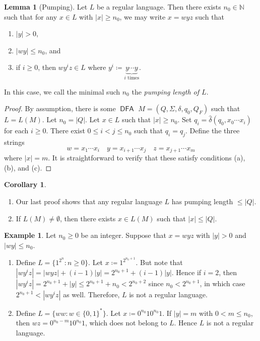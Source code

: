 \documentclass[10pt,letterpaper,cm]{nupset}
\theoremstyle{definition}
\newtheorem{exmp}[definition]{Example}
\theoremstyle{theorem}
\newtheorem{lemma}[definition]{Lemma}
\newtheorem{corollary}[definition]{Corollary}
\theoremstyle{remark}
\newcommand{\N}{\mathbb N}
\newcommand{\1}{\mathbf{1}}
\newcommand{\0}{\vec 0}
\DeclareMathOperator{\DFA}{\mathsf{DFA}}
\begin{document}
\begin{lemma}[Pumping] Let $L$ be a regular language. Then there exists $n_0 \in \N$ such that for any $x\in L$ with $|x|\geq n_0$, we may write $x=wyz$ such that
\begin{enumerate}[label=(\alph*)]
\item $|y| >0$,
\item $|wy|\leq n_0$, and
\item if $i\geq 0$, then $wy^iz \in L$ where $y^i \coloneqq \underbrace{y\cdots y}_{i \text{ times}}$.
\end{enumerate}
In this case, we call the minimal such $n_0$ the \textit{pumping length of $L$}.
\end{lemma}
\begin{proof}
By assumption, there is some $\DFA$ $M = (Q, \Sigma, \delta, q_0, Q_F)$ such that $L = L(M)$. Let $n_0 = |Q|$. Let $x\in L$ such that $|x|\geq n_0$. Set $q_i = \hat{\delta}(q_0, x_0 \cdots x_i)$ for each $i\geq 0$.  There exist $0\leq i<j \leq n_0$ such that $q_i = q_j$. Define the three strings $$w= x_1\cdots x_i \quad  y= x_{i+1}\cdots x_j \quad z= x_{j+1} \cdots x_m$$ where $|x| = m$. It is straightforward to verify that these satisfy conditions (a), (b), and (c).
\end{proof}
\begin{corollary} $ $
\begin{enumerate} 
\item Our last proof shows that any regular language $L$ has pumping length $\leq |Q|$.
\item If $L(M) \ne \emptyset$, then there exists $x\in L(M)$ such that $|x| \leq |Q|$.
\end{enumerate}
\end{corollary}

\begin{exmp} Let $n_0\geq 0$ be an integer. Suppose that $x=wyz$ with $|y| >0$ and $|wy|\leq n_0$.
\begin{enumerate}
\item Define $L=  \{ 1^{2^n} : n\geq 0\}$. Let $x\coloneqq 1^{2^{n_0+1}}$.  But note that $|wy^iz| = |wyz| + (i-1)|y| = 2^{n_0+1} + (i-1)|y|$. Hence if $i=2$, then $|wy^i z| = 2^{n_0+1} +|y| \leq 2^{n_0+1} +n_0 < 2^{n_0+2}$ since $n_0 < 2^{n_0+1}$, in which case $2^{n_0+1} < |wy^iz|$ as well. Therefore, $L$ is not a regular language. 
\item Define $L = \{ ww : w \in \{0,1\}^{\ast}\}$. Let $x\coloneqq 0^{n_0}10^{n_0}1$. If $|y|= m$ with $0<m\leq n_0$,  then $wz= 0^{n_0-m}10^{n_0}1$, which does not belong to $L$. Hence $L$ is not a regular language. 
\end{enumerate}
\end{exmp}
\end{document}
